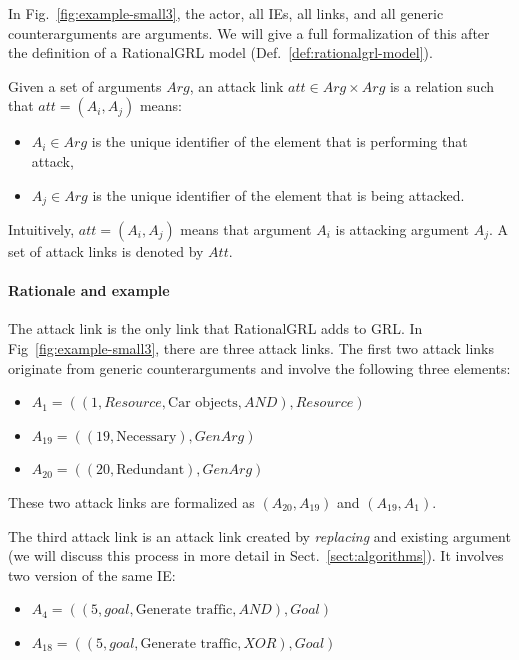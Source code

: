 In Fig.~\ref{fig:example-small3}, the actor, all IEs, all links, and all generic counterarguments are arguments. We will give a full formalization of this after the definition of a RationalGRL model (Def.~\ref{def:rationalgrl-model}).

\begin{definition}
\label{def:link:attack}
Given a set of arguments $Arg$, an attack link $att\in Arg\times Arg$ is a relation such that $att=(A_i,A_j)$ means:
\begin{itemize}
\item $A_i\in Arg$ is the unique identifier of the element that is performing that attack,
\item $A_j\in Arg$ is the unique identifier of the element that is being attacked.
\end{itemize}
Intuitively, $att=(A_i,A_j)$ means that argument $A_i$ is attacking argument $A_j$. A set of attack links is denoted by $Att$.
\end{definition}

\paragraph{Rationale and example} The attack link is the only link that RationalGRL adds to GRL. In Fig~\ref{fig:example-small3}, there are three attack links. The first two attack links originate from generic counterarguments and involve the following three elements:
\begin{itemize}
\item $A_1 = ((1, Resource, \text{Car objects}, AND), Resource)$
\item $A_{19} = ((19, \text{Necessary}), GenArg)$
\item $A_{20} = ((20, \text{Redundant}), GenArg)$
\end{itemize}

These two attack links are formalized as $(A_{20},A_{19})$ and $(A_{19}, A_1)$.

The third attack link is an attack link created by \emph{replacing} and existing argument (we will discuss this process in more detail in Sect.~\ref{sect:algorithms}). It involves two version of the same IE:
\begin{itemize}
\item $A_{4} = ((5, goal, \text{Generate traffic}, AND), Goal)$
\item $A_{18} = ((5, goal, \text{Generate traffic}, XOR), Goal)$
\end{itemize}


